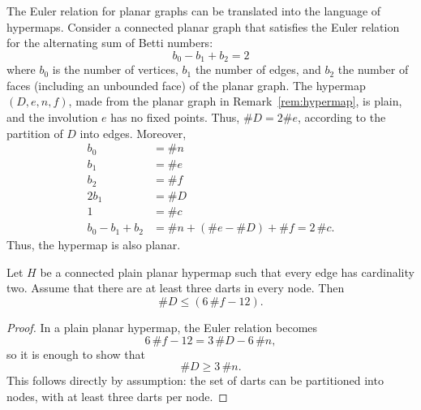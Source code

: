 \begin{remark}\label{rem:Euler}   
The Euler relation for planar graphs can be translated into the
language of hypermaps.  Consider a connected planar graph that
satisfies the Euler relation for the alternating sum of Betti
numbers:
\begin{displaymath}b_0 - b_1 + b_2 = 2\end{displaymath} where $b_0$
is the number of vertices, $b_1$ the number of edges, and $b_2$ the
number of faces (including an unbounded face) of the planar
graph. The hypermap $(D,e,n,f)$, made from the planar graph in
Remark~\ref{rem:hypermap}, is plain, and the involution $e$ has no fixed points.  
Thus, $\# D = 2\#e$, according to the partition of $D$ into edges.  Moreover,
\begin{displaymath}\begin{array}{lll}
b_0 &= \# n\\
b_1 &= \# e\\
b_2 &= \# f\\
2b_1 &= \# D\\
1 &= \#c\\
b_0 - b_1 + b_2  &= \# n + (\#e - \#D) + \# f = 2\,\# c.
\end{array}
\end{displaymath}
Thus, the hypermap is also planar.
\end{remark}


\begin{lemma}\label{lemma:dart-upper} 
Let $H$ be a connected plain planar hypermap such that every edge
has cardinality two.  Assume that there are at least three darts in
every node.  Then
\begin{displaymath}
\# D \le (6\, \#f - 12).
\end{displaymath}
\end{lemma}
%

\begin{proof}  In a plain planar hypermap, the Euler relation becomes
\begin{displaymath}6\, \#f - 12 = 3\,\#D - 6\,\#n,\end{displaymath}
so it is enough to show that
\begin{displaymath}
\# D \ge 3\,\#n.
\end{displaymath}
This follows directly by assumption: the set of darts can be
partitioned into nodes, with at least three darts per node.
\end{proof}


